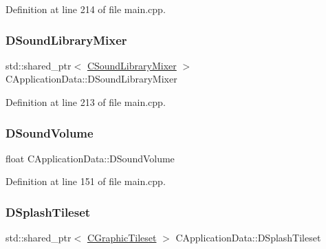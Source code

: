 Definition at line 214 of file main.\+cpp.

\hypertarget{classCApplicationData_aa1e6876121bb4fb229ec6b930a8a6766}{}\label{classCApplicationData_aa1e6876121bb4fb229ec6b930a8a6766} 
\subsubsection{\texorpdfstring{D\+Sound\+Library\+Mixer}{DSoundLibraryMixer}}
{\footnotesize\ttfamily std\+::shared\+\_\+ptr$<$ \hyperlink{classCSoundLibraryMixer}{C\+Sound\+Library\+Mixer} $>$ C\+Application\+Data\+::\+D\+Sound\+Library\+Mixer\hspace{0.3cm}{\ttfamily [protected]}}



Definition at line 213 of file main.\+cpp.

\hypertarget{classCApplicationData_aa6e540f860dcb1929ef36ddce3be3691}{}\label{classCApplicationData_aa6e540f860dcb1929ef36ddce3be3691} 
\subsubsection{\texorpdfstring{D\+Sound\+Volume}{DSoundVolume}}
{\footnotesize\ttfamily float C\+Application\+Data\+::\+D\+Sound\+Volume\hspace{0.3cm}{\ttfamily [protected]}}



Definition at line 151 of file main.\+cpp.

\hypertarget{classCApplicationData_aea23915b726e1a5aa68a309109679ae1}{}\label{classCApplicationData_aea23915b726e1a5aa68a309109679ae1} 
\subsubsection{\texorpdfstring{D\+Splash\+Tileset}{DSplashTileset}}
{\footnotesize\ttfamily std\+::shared\+\_\+ptr$<$ \hyperlink{classCGraphicTileset}{C\+Graphic\+Tileset} $>$ C\+Application\+Data\+::\+D\+Splash\+Tileset\hspace{0.3cm}{\ttfamily [protected]}}



